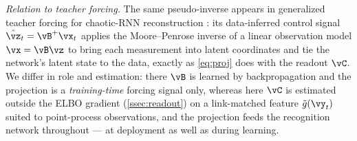 \documentclass[11pt]{article}
\begin{document}
\emph{Relation to teacher forcing.} The same pseudo-inverse appears in generalized teacher
forcing for chaotic-RNN reconstruction \autocite{hess2023generalized}: its data-inferred control
signal $\hat\vz_t=\vB^{+}\vx_t$ applies the Moore--Penrose inverse of a linear observation model
$\vx=\vB\vz$ to bring each measurement into latent coordinates and tie the network's latent state
to the data, exactly as \cref{eq:proj} does with the readout $\vC$. We differ in role and
estimation: there $\vB$ is learned by backpropagation and the projection is a \emph{training-time}
forcing signal only, whereas here $\vC$ is estimated outside the ELBO gradient (\cref{ssec:readout})
on a link-matched feature $\tilde g(\vy_t)$ suited to point-process observations, and the projection
feeds the recognition network throughout --- at deployment as well as during learning.
\end{document}
